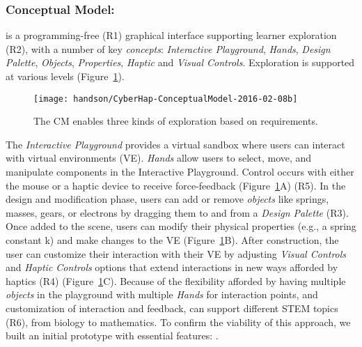 


\subsubsection{Conceptual Model:}%

\HandsOn is a programming-free (R1) graphical interface supporting learner exploration (R2), with a number of key \emph{concepts}: \textit{Interactive Playground}, \textit{Hands}, \textit{Design Palette}, \textit{Objects}, \textit{Properties}, \textit{Haptic} and \textit{Visual Controls}.
Exploration is supported at various levels (Figure~\ref{fig:conceptObjects}).

\begin{figure} [b]
  \centering
  \texttt{[image: handson/CyberHap-ConceptualModel-2016-02-08b]}
  \caption{The \HandsOn CM enables three kinds of exploration based on requirements.}
  \label{fig:conceptObjects}
\end{figure}

The \emph{Interactive Playground} provides a virtual sandbox where
users can interact with virtual environments (VE). %
\emph{Hands} allow users to select, move, and manipulate components in the Interactive Playground. %
Control occurs with either the mouse or a haptic device to receive force-feedback (Figure~\ref{fig:conceptObjects}A) (R5). In the design and modification phase, users can add or remove \emph{objects} like springs, masses, gears, or electrons by dragging them to and from a \emph{Design Palette} (R3). Once added to the scene, users can modify their physical properties (e.g., a spring constant k) and make changes to the VE (Figure~\ref{fig:conceptObjects}B). After construction, the user can customize their interaction with their VE by adjusting \emph{Visual Controls} and \emph{Haptic Controls} options that extend interactions in new ways afforded by haptics (R4) (Figure~\ref{fig:conceptObjects}C). Because of the flexibility afforded by having multiple \emph{objects} in the playground with multiple \emph{Hands} for interaction points, and customization of interaction and feedback, \HandsOn can support different STEM topics (R6), from biology to mathematics.
To confirm the viability of this approach, we built an initial prototype with essential features: \SpringSim.


